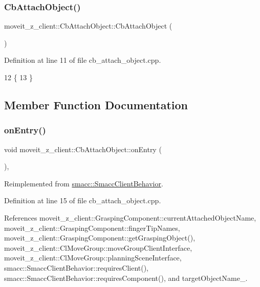 \subsubsection{\texorpdfstring{Cb\+Attach\+Object()}{CbAttachObject()}\hspace{0.1cm}{\footnotesize\ttfamily [2/2]}}
{\footnotesize\ttfamily moveit\+\_\+z\+\_\+client\+::\+Cb\+Attach\+Object\+::\+Cb\+Attach\+Object (\begin{DoxyParamCaption}{ }\end{DoxyParamCaption})}



Definition at line 11 of file cb\+\_\+attach\+\_\+object.\+cpp.


\begin{DoxyCode}
12     \{
13     \}
\end{DoxyCode}


\subsection{Member Function Documentation}
\mbox{\label{classmoveit__z__client_1_1CbAttachObject_ad6b02ebdaf8b6d93f3d00bc901e33bcd}} 
\subsubsection{\texorpdfstring{on\+Entry()}{onEntry()}}
{\footnotesize\ttfamily void moveit\+\_\+z\+\_\+client\+::\+Cb\+Attach\+Object\+::on\+Entry (\begin{DoxyParamCaption}{ }\end{DoxyParamCaption})\hspace{0.3cm}{\ttfamily [override]}, {\ttfamily [virtual]}}



Reimplemented from \hyperlink{classsmacc_1_1SmaccClientBehavior_a7962382f93987c720ad432fef55b123f}{smacc\+::\+Smacc\+Client\+Behavior}.



Definition at line 15 of file cb\+\_\+attach\+\_\+object.\+cpp.



References moveit\+\_\+z\+\_\+client\+::\+Grasping\+Component\+::current\+Attached\+Object\+Name, moveit\+\_\+z\+\_\+client\+::\+Grasping\+Component\+::finger\+Tip\+Names, moveit\+\_\+z\+\_\+client\+::\+Grasping\+Component\+::get\+Grasping\+Object(), moveit\+\_\+z\+\_\+client\+::\+Cl\+Move\+Group\+::move\+Group\+Client\+Interface, moveit\+\_\+z\+\_\+client\+::\+Cl\+Move\+Group\+::planning\+Scene\+Interface, smacc\+::\+Smacc\+Client\+Behavior\+::requires\+Client(), smacc\+::\+Smacc\+Client\+Behavior\+::requires\+Component(), and target\+Object\+Name\+\_\+.


